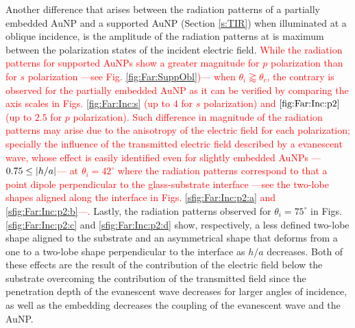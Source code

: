 Another difference that arises between  the radiation patterns of a partially embedded AuNP and a supported AuNP (Section \ref{s:TIR}) when illuminated at a oblique incidence, is the amplitude of the radiation patterns at is maximum between the  polarization states of the incident electric field. \textcolor{red}{While the radiation patterns for supported AuNPs show a greater magnitude for  $p$ polarization than for $s$ polarization ---see Fig. \ref{fig:Far:SuppObl})--- when $\theta_i \gtrapprox  \theta_c$, the contrary is observed for the partially embedded AuNP as it can be verified by comparing the axis scales in Figs. \ref{fig:Far:Inc:s} (up to $4$ for $s$ polarization) and $\ref{fig:Far:Inc:p2}$ (up to $2.5$ for $p$ polarization). Such difference in magnitude of the radiation patterns may arise due to the anisotropy of the electric field for each polarization; specially the influence of the transmitted electric field described by a evanescent wave, whose effect is easily identified even for slightly embedded AuNPs ---$0.75\leq\abs{h/a}$--- at $\theta_i=42^\circ$ where the radiation patterns correspond to that a point dipole perpendicular to the glass-substrate interface ---see the two-lobe shapes aligned along the interface in Figs. \ref{sfig:Far:Inc:p2:a} and \ref{sfig:Far:Inc:p2:b}---.} Lastly, the radiation patterns observed for $\theta_i = 75^\circ$ in Figs. \ref{sfig:Far:Inc:p2:c} and \ref{sfig:Far:Inc:p2:d} show, respectively, a less defined two-lobe shape aligned to the substrate and an asymmetrical shape that deforms from  a one to a two-lobe shape perpendicular to the interface as $h/a$ decreases. Both of these effects  are the result of the contribution of the electric field below the substrate overcoming the contribution of the transmitted field since the penetration depth of the evanescent wave decreases for larger angles of incidence, as well as the embedding  decreases the coupling of the evanescent wave and the AuNP.

